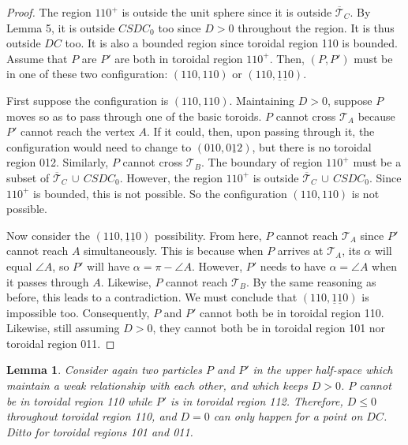 \documentclass[a4paper, twoside]{article}
\newtheorem{lemma}{Lemma}
\begin{document}
\begin{proof}

The region $110^+$ is outside the unit sphere since it is outside $\overline{\mathcal{T}}_C$. By Lemma 5, it is outside $CSDC_0$ too since $D > 0$ throughout the region. It is thus outside $DC$ too. It is also a bounded region since toroidal region 110 is bounded. Assume that $P$ are $P'$ are both in toroidal region $110^+$. Then, $(P, P')$ must be in one of these two configuration: $(110, 110)$ or $(110, \underline{1}\underline{1}0)$. 

First suppose the configuration is $(110, 110)$. Maintaining $D > 0$, suppose $P$ moves so as to pass through one of the basic toroids. $P$ cannot cross $\mathcal{T}_A$ because $P'$ cannot reach the vertex $A$. If it could, then, upon passing through it, the configuration would need to change to $(010, 0\underline{1}2)$, but there is no toroidal region 012. Similarly, $P$ cannot cross $\mathcal{T}_B$. The boundary of region $110^+$ must be a subset of $\overline{\mathcal{T}}_C \, \cup \, CSDC_0$. However, the region  $110^+$ is outside $\overline{\mathcal{T}}_C \, \cup \, CSDC_0$. Since $110^+$ is bounded, this is not possible. So the configuration $(110, 110)$ is not possible. 

Now consider the $(110, \underline{1}\underline{1}0)$ possibility. From here, $P$ cannot reach $\mathcal{T}_A$ since $P'$ cannot reach $A$ simultaneously. This is because when $P$ arrives at $\mathcal{T}_A$, its $\alpha$ will equal $\angle A$, so $P'$ will have $\alpha = \pi - \angle A$. However, $P'$ needs to have $\alpha = \angle A$ when it passes through $A$. Likewise, $P$ cannot reach $\mathcal{T}_B$. By the same reasoning as before, this leads to a contradiction. 
We must conclude that $(110, \underline{1}\underline{1}0)$ is impossible too. Consequently, $P$ and $P'$ cannot both be in toroidal region 110. Likewise, still assuming $D > 0$, they cannot both be in toroidal region 101 nor toroidal region 011.  

\end{proof}

\vspace{2mm}

\begin{lemma}

Consider again two particles $P$ and $P'$ in the upper half-space which maintain a weak relationship with each other, and which keeps $D > 0$. $P$ cannot be in toroidal region 110 while $P'$ is in toroidal region 112. Therefore, $D \le 0$ throughout toroidal region 110, and $D = 0$ can only happen for a point on $DC$. Ditto for toroidal regions 101 and 011. \\

\end{lemma}
\end{document}
